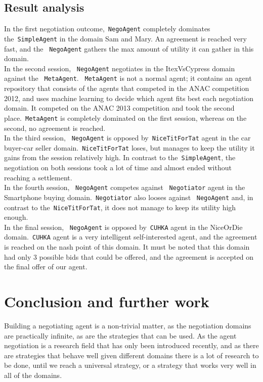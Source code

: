 \documentclass[html]{report}    %
\begin{document}
\subsection{Result analysis}
In the first negotiation outcome,~\texttt{NegoAgent} completely dominates the~\texttt{SimpleAgent}  in the domain Sam and Mary. An agreement is reached very fast, and the ~\texttt{NegoAgent} gathers the max amount of utility it can gather in this domain. 
\\In the second session, ~\texttt{NegoAgent} negotiates in the ItexVsCypress domain against the ~\texttt{MetaAgent}. ~\texttt{MetaAgent} is not a normal agent; it contains an agent repository that consists of the agents that competed in the ANAC competition 2012, and uses machine learning to decide which agent fits best each negotiation domain. It competed on the ANAC 2013 competition and took the second place.~\texttt{MetaAgent} is completely dominated on the first session, whereas on the second, no agreement is reached.
\\In the third session, ~\texttt{NegoAgent} is opposed by~\texttt{NiceTitForTat} agent in the car buyer-car seller domain.~\texttt{NiceTitForTat} loses, but manages to keep the utility it gains from the session relatively high. In contrast to the~\texttt{SimpleAgent}, the negotiation on both sessions took a lot of time and almost ended without reaching a settlement.
\\In the fourth session, ~\texttt{NegoAgent} competes against ~\texttt{Negotiator} agent in the Smartphone buying domain.~\texttt{Negotiator} also looses against ~\texttt{NegoAgent} and, in contrast to the~\texttt{NiceTitForTat}, it does not manage to keep its utility high enough.
\\In the final session, ~\texttt{NegoAgent} is opposed by~\texttt{CUHKA} agent in the NiceOrDie domain.~\texttt{CUHKA} agent is a very intelligent self-interested agent, and the agreement is reached on the nash point of this domain. It must be noted that this domain had only 3 possible bids that could be offered, and the agreement is accepted on the final offer of our agent.

\section{Conclusion and further work}
Building a negotiating agent is a non-trivial matter, as the negotiation domains are practically infinite, as are the strategies that can be used. As the agent negotiation is a research field that has only been introduced recently, and as there are strategies that behave well given different domains there is a lot of research to be done, until we reach a universal strategy, or a strategy that works very well in all of the domains.
\end{document}
